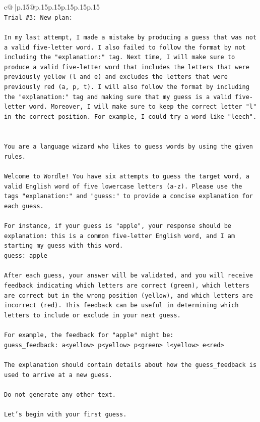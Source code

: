 \documentclass{article}
\begin{document}
{\begin{supertabular}{c@{$\;$}|p{.15\linewidth}@{}p{.15\linewidth}p{.15\linewidth}p{.15\linewidth}p{.15\linewidth}p{.15\linewidth}}
{{{\\ 
\texttt{Trial \#3: New plan: } \\
\\ 
\texttt{In my last attempt, I made a mistake by producing a guess that was not a valid five{-}letter word. I also failed to follow the format by not including the "explanation:" tag. Next time, I will make sure to produce a valid five{-}letter word that includes the letters that were previously yellow (l and e) and excludes the letters that were previously red (a, p, t). I will also follow the format by including the "explanation:" tag and making sure that my guess is a valid five{-}letter word. Moreover, I will make sure to keep the correct letter "l" in the correct position. For example, I could try a word like "leech".} \\
\\ 
\\ 
\texttt{You are a language wizard who likes to guess words by using the given rules.} \\
\\ 
\texttt{Welcome to Wordle! You have six attempts to guess the target word, a valid English word of five lowercase letters (a{-}z). Please use the tags "explanation:" and "guess:" to provide a concise explanation for each guess.} \\
\\ 
\texttt{For instance, if your guess is "apple", your response should be} \\
\texttt{explanation: this is a common five{-}letter English word, and I am starting my guess with this word.} \\
\texttt{guess: apple} \\
\\ 
\texttt{After each guess, your answer will be validated, and you will receive feedback indicating which letters are correct (green), which letters are correct but in the wrong position (yellow), and which letters are incorrect (red). This feedback can be useful in determining which letters to include or exclude in your next guess.} \\
\\ 
\texttt{For example, the feedback for "apple" might be:} \\
\texttt{guess\_feedback: a<yellow> p<yellow> p<green> l<yellow> e<red>} \\
\\ 
\texttt{The explanation should contain details about how the guess\_feedback is used to arrive at a new guess.} \\
\\ 
\texttt{Do not generate any other text.} \\
\\ 
\texttt{Let's begin with your first guess.} \\
            }
        }
    }
     \\ \\


\end{supertabular}}
\end{document}
